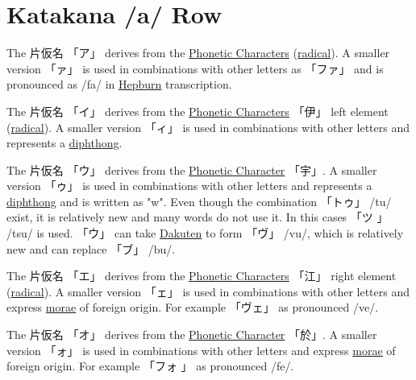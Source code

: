 \section{Katakana /a/ Row}\label{sec:KatakanaARow}


\label{letter:a} The 片仮名 {「ア」} derives from the
\hyperref[sec:PhoneticCharacter]{Phonetic Characters}
(\hyperref[sec:Radical]{radical}).  A smaller version {「ァ」} is used in
combinations with other letters as {「ファ」} and is pronounced as /fa/ in
\hyperref[sec:Hepburn]{Hepburn} transcription.

\label{letter:i} The 片仮名 {「イ」} derives from the
\hyperref[sec:PhoneticCharacter]{Phonetic Characters} {「伊」} left element
(\hyperref[sec:Radical]{radical}).  A smaller version {「ィ」} is used in
combinations with other letters and represents a
\hyperref[sec:Diphthong]{diphthong}. 

\label{letter:u} The 片仮名 {「ウ」} derives from the
\hyperref[sec:PhoneticCharacter]{Phonetic Character} {「宇」}. A smaller version
{「ゥ」} is used in combinations with other letters and represents a
\hyperref[sec:Diphthong]{diphthong} and is written as "w". Even though the
combination {「トゥ」} /tu/ exist, it is relatively new and many words do not
use it. In this cases {「ツ 」} /tsu/ is used. {「ウ」} can take
\hyperref[sec:Dakuten]{Dakuten} to form {「ヴ」} /vu/, which is relatively new
and can replace {「ブ」} /bu/. 



\newpage 

\label{letter:e} The 片仮名 {「エ」} derives from the
\hyperref[sec:PhoneticCharacter]{Phonetic Characters} {「江」} right element
(\hyperref[sec:Radical]{radical}). A smaller version {「ェ」} is used in
combinations with other letters and express \hyperref[sec:Mora]{morae} of
foreign origin. For example {「ヴェ」} as pronounced /ve/.

\label{letter:o} The 片仮名 {「オ」} derives from the
\hyperref[sec:PhoneticCharacter]{Phonetic Character} {「於」}. A smaller version
{「ォ」} is used in combinations with other letters and express
\hyperref[sec:Mora]{morae} of foreign origin. For example {「フォ 」} as
pronounced /fe/.

\newpage

